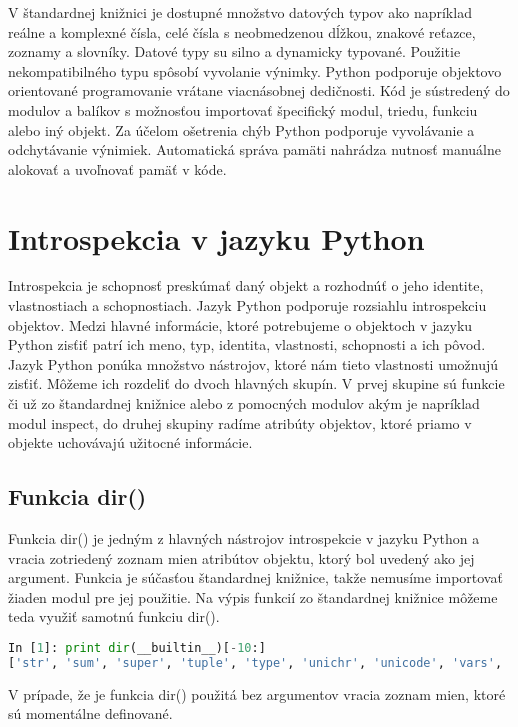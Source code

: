 \documentclass[11pt,oneside,final]{fithesis2}
\begin{document}
	V štandardnej knižnici je dostupné množstvo datových typov ako napríklad reálne a komplexné čísla, celé čísla s neobmedzenou dĺžkou, znakové reťazce, zoznamy a slovníky. Datové typy su silno a dynamicky typované. Použitie nekompatibilného typu spôsobí vyvolanie výnimky. Python podporuje objektovo orientované programovanie vrátane viacnásobnej dedičnosti. Kód je sústredený do modulov a balíkov s možnosťou importovať špecifický modul, triedu, funkciu alebo iný objekt. Za účelom ošetrenia chýb Python podporuje vyvolávanie a odchytávanie výnimiek. Automatická správa pamäti nahrádza nutnosť manuálne alokovať a uvoľnovať pamäť v kóde.


	\section{Introspekcia v jazyku Python}
		Introspekcia je schopnosť preskúmať daný objekt a rozhodnúť o jeho identite, vlastnostiach a schopnostiach. Jazyk Python podporuje rozsiahlu introspekciu objektov. Medzi hlavné informácie, ktoré potrebujeme o objektoch v jazyku Python zisťiť patrí ich meno, typ, identita, vlastnosti, schopnosti a ich pôvod. Jazyk Python ponúka množstvo nástrojov, ktoré nám tieto vlastnosti umožnujú zisťiť. Môžeme ich rozdeliť do dvoch hlavných skupín. V prvej skupine sú funkcie či už zo štandardnej knižnice alebo z pomocných modulov akým je napríklad modul inspect, do druhej skupiny radíme atribúty objektov, ktoré priamo v objekte uchovávajú užitocné informácie.
	
		\subsection{Funkcia dir()}
			Funkcia dir() je jedným z hlavných nástrojov introspekcie v jazyku Python a vracia zotriedený zoznam mien atribútov objektu, ktorý bol uvedený ako jej argument. Funkcia je súčasťou štandardnej knižnice, takže nemusíme importovať žiaden modul pre jej použitie. Na výpis funkcií zo štandardnej knižnice môžeme teda využiť samotnú funkciu dir().
			

\begin{lstlisting}[language=python]
In [1]: print dir(__builtin__)[-10:]
['str', 'sum', 'super', 'tuple', 'type', 'unichr', 'unicode', 'vars', 'xrange', 'zip']
\end{lstlisting}

			 V prípade, že je funkcia dir() použitá bez argumentov vracia zoznam mien, ktoré sú momentálne definované.
\end{document}

